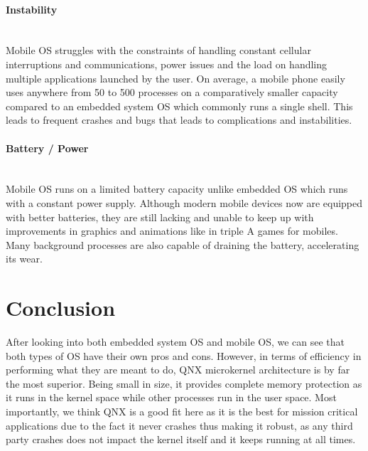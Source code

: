 \documentclass[conference]{IEEEtran}
\newcommand{\forceindent}{\leavevmode{\parindent=1em\indent}}
\begin{document}
\paragraph{Instability} \mbox{} \\
\forceindent Mobile OS struggles with the constraints of handling constant cellular interruptions and communications, power issues and the load on handling multiple applications launched by the user\cite{AAWP}. On average, a mobile phone easily uses anywhere from 50 to 500 processes on a comparatively smaller capacity compared to an embedded system OS which commonly runs a single shell. This leads to frequent crashes and bugs that leads to complications and instabilities.

\medskip
\paragraph{Battery / Power} \mbox{} \\
\forceindent Mobile OS runs on a limited battery capacity unlike embedded OS which runs with a constant power supply. Although modern mobile devices now are equipped with better batteries, they are still lacking and unable to keep up with improvements in graphics and animations like in triple A games for mobiles. Many background processes are also capable of draining the battery, accelerating its wear.

\section{Conclusion}
\forceindent After looking into both embedded system OS and mobile OS, we can see that both types of OS have their own pros and cons. However, in terms of efficiency in performing what they are meant to do, QNX microkernel architecture is by far the most superior. Being small in size, it provides complete memory protection as it runs in the kernel space while other processes run in the user space. Most importantly, we think QNX is a good fit here as it is the best for mission critical applications due to the fact it never crashes thus making it robust, as any third party crashes does not impact the kernel itself and it keeps running at all times\cite{quora}.




\end{document}
